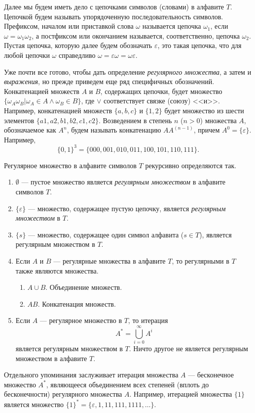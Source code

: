 Далее мы будем иметь дело с цепочками символов (словами) в алфавите $T$. Цепочкой будем называть упорядоченную последовательность символов. Префиксом, началом или приставкой слова $\omega$ называется цепочка $\omega_1$, если $\omega=\omega_1\omega_2$, а постфиксом или окончанием называется, соответственно, цепочка $\omega_2$. Пустая цепочка, которую далее будем обозначать $\varepsilon$, это такая цепочка, что для любой цепочки $\omega$ справедливо $\omega=\varepsilon\omega=\omega\varepsilon$.

Уже почти все готово, чтобы дать определение \emph{регулярного множества}, а затем и \emph{выражения}, но прежде приведем еще ряд специфичных обозначений. Конкатенацией множеств $A$ и $B$, содержащих цепочки, будет множество $\{\omega_A \omega_B |\omega_A\in A\land \omega_B\in B\}$, где $\lor$ соответствует связке (союзу) <<и>>. Например, конкатенацией множеств $\{a,b,c\}$ и $\{1,2\}$ будет множество из шести элементов $\{a1,a2,b1,b2,c1,c2\}$. Возведением в степень $n$ ($n>0$) множества $A$, обозначаемое как $A^n$, будем называть конкатенацию $AA^{(n-1)}$, причем $A^0=\{\varepsilon\}$. Например,
\[
\{0,1\}^3=\{000,001,010,011,100,101,110,111\}.
\]

Регулярное множество в алфавите символов $T$ рекурсивно определяются так.
\begin{enumerate}
	\item $\emptyset$ --- пустое множество является \emph{регулярным множеством} в алфавите символов $T$.
	\item $\{\varepsilon\}$ --- множество, содержащее пустую цепочку, является \emph{регулярным множеством} в $T$.
	\item $\{s\}$ --- множество, содержащее один символ алфавита ($s\in T$), является регулярным множеством в $T$.
	\item Если $A$ и $B$ --- регулярные множества в алфавите $T$, то регулярными в $T$ также являются множества.
    \begin{enumerate}
        \item $A\cup B$. Объединение множеств.
        \item $AB$. Конкатенация множеств.
    \end{enumerate}
	\item Если $A$ --- регулярное множество в $T$, то итерация 
    \[A^*=\bigcup_{i=0}^{\infty}A^i\] является регулярным множеством в $T$.
	Ничто другое не является регулярным множеством в алфавите $T$.
\end{enumerate}

Отдельного упоминания заслуживает итерация множества $A$ --- бесконечное множество $A^*$, являющееся объединением всех степеней (вплоть до бесконечности) регулярного множества $A$. Например, итерацией множества $\{1\}$ является множество $\{1\}^*=\{\varepsilon,1,11,111,1111,\ldots\}$.

